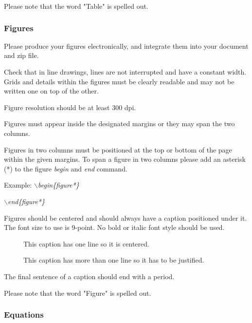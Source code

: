 \documentclass[a4paper,twoside]{article}
\begin{document}
Please note that the word "Table" is spelled out.


\subsubsection{Figures}

Please produce your figures electronically, and integrate them into
your document and zip file.

Check that in line drawings, lines are not interrupted and have a
constant width. Grids and details within the figures must be clearly
readable and may not be written one on top of the other.

Figure resolution should be at least 300 dpi.

Figures must appear inside the designated margins or they may span
the two columns.

Figures in two columns must be positioned at the top or bottom of
the page within the given margins. To span a figure in two columns please add an asterisk (*) to the figure \textit{begin} and \textit{end} command.

Example: \textit{$\backslash$begin\{figure*\}}

\hspace*{1.5cm}\textit{$\backslash$end\{figure*\}}

Figures should be centered and should always have a caption
positioned under it. The font size to use is 9-point. No bold or
italic font style should be used.

\begin{figure}[!h]
  \centering
   {}
  \caption{This caption has one line so it is centered.}
  \label{fig:example1}
 \end{figure}

\begin{figure}[!h]
  \vspace{-0.2cm}
  \centering
   {}
  \caption{This caption has more than one line so it has to be justified.}
  \label{fig:example2}
  \vspace{-0.1cm}
\end{figure}

The final sentence of a caption should end with a period.



Please note that the word "Figure" is spelled out.

\subsubsection{Equations}
\end{document}
